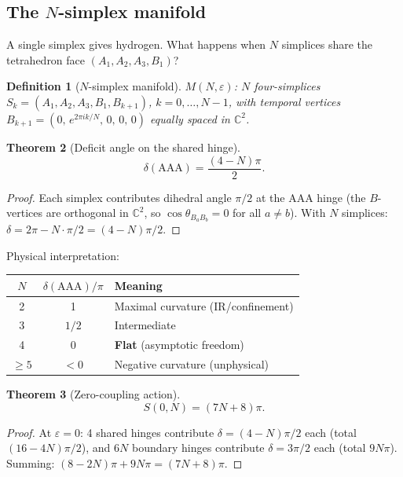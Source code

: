 \documentclass[12pt]{article}
\newtheorem{theorem}{Theorem}[section]
\newtheorem{definition}[theorem]{Definition}
\theoremstyle{remark}
\theoremstyle{definition}
\newcommand{\CC}{\mathbb{C}}
\begin{document}
\subsection{The $N$-simplex manifold}
\label{sec:n_simplex}

A single simplex gives hydrogen.  What happens when $N$ simplices share the tetrahedron face $(A_1, A_2, A_3, B_1)$?

\begin{definition}[$N$-simplex manifold]
$M(N,\varepsilon)$: $N$ four-simplices $S_k = (A_1, A_2, A_3, B_1, B_{k+1})$, $k = 0,\ldots,N\!-\!1$, with temporal vertices $B_{k+1} = (0,\, e^{2\pi i k/N},\, 0,\, 0,\, 0)$ equally spaced in $\CC^2$.
\end{definition}

\begin{theorem}[Deficit angle on the shared hinge]
\label{thm:deficit_N}
\begin{equation}
\boxed{\delta(\mathrm{AAA}) = \frac{(4-N)\pi}{2}.}
\end{equation}
\end{theorem}
\begin{proof}
Each simplex contributes dihedral angle $\pi/2$ at the AAA hinge (the $B$-vertices are orthogonal in $\CC^2$, so $\cos\theta_{B_a B_b} = 0$ for all $a \neq b$).  With $N$ simplices: $\delta = 2\pi - N\cdot\pi/2 = (4-N)\pi/2$.
\end{proof}

Physical interpretation:
\begin{center}
\begin{tabular}{ccl}
\hline
$N$ & $\delta(\mathrm{AAA})/\pi$ & Meaning \\
\hline
2 & 1 & Maximal curvature (IR/confinement) \\
3 & $1/2$ & Intermediate \\
4 & $0$ & \textbf{Flat} (asymptotic freedom) \\
$\geq 5$ & $<0$ & Negative curvature (unphysical) \\
\hline
\end{tabular}
\end{center}

\begin{theorem}[Zero-coupling action]
\label{thm:action_zero}
\begin{equation}
S(0, N) = (7N + 8)\pi.
\end{equation}
\end{theorem}
\begin{proof}
At $\varepsilon = 0$: 4 shared hinges contribute $\delta = (4\!-\!N)\pi/2$ each (total $(16\!-\!4N)\pi/2$), and $6N$ boundary hinges contribute $\delta = 3\pi/2$ each (total $9N\pi$).  Summing: $(8\!-\!2N)\pi + 9N\pi = (7N\!+\!8)\pi$.
\end{proof}
\end{document}
